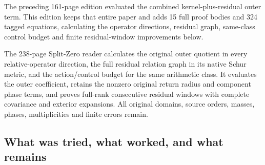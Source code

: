 \documentclass[
]{article}
\begin{document}
The preceding 161-page edition evaluated the combined
kernel-plus-residual outer term. This edition keeps that entire paper
and adds 15 full proof bodies and 324 tagged equations, calculating the
operator directions, residual graph, same-class control budget and
finite residual-window improvements below.

The 238-page Split-Zero reader calculates the original outer quotient in
every relative-operator direction, the full residual relation graph in
its native Schur metric, and the action/control budget for the same
arithmetic class. It evaluates the outer coefficient, retains the
nonzero original return radius and component phase terms, and proves
full-rank consecutive residual windows with complete covariance and
exterior expansions. All original domains, source orders, masses,
phases, multiplicities and finite errors remain.

\subsection{What was tried, what worked, and what
remains}\label{what-was-tried-what-worked-and-what-remains-1}
\end{document}
